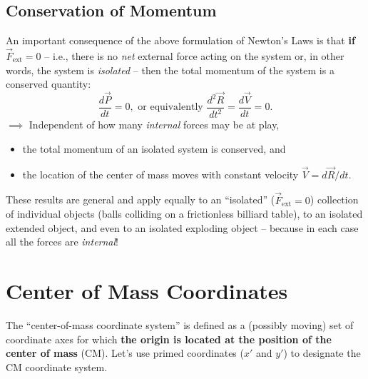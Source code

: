 \documentclass[11pt, letterpaper, openany]{book}
\begin{document}
\subsection*{Conservation of Momentum}

An important consequence of the above formulation of Newton's Laws is that \textbf{if} $\vec{F}_{\text{ext}} = 0$ -- i.e., there is no \textit{net} external force acting on the system or, in other words, the system is \textit{isolated} -- then the total momentum of the system is a conserved quantity:
\[ \frac{d\vec{P}}{dt} = 0, \text{ or equivalently } \frac{d^2\vec{R}}{dt^2} = \frac{d\vec{V}}{dt} = 0. \]
$\implies$ Independent of how many \textit{internal} forces may be at play,
\begin{itemize}
    \item the total momentum of an isolated system is conserved, and
    \item the location of the center of mass moves with constant velocity $\vec{V} = d\vec{R}/dt$.
\end{itemize}
These results are general and apply equally to an ``isolated'' ($\vec{F}_{\text{ext}} = 0$) collection of individual objects (balls colliding on a frictionless billiard table), to an isolated extended object, and even to an isolated exploding object -- because in each case all the forces are \textit{internal}!

\section*{Center of Mass Coordinates}

The ``center-of-mass coordinate system'' is defined as a (possibly moving) set of coordinate axes for which \textbf{the origin is located at the position of the center of mass} (CM). Let's use primed coordinates ($x'$ and $y'$) to designate the CM coordinate system.

\begin{center}
\end{center}
\end{document}
